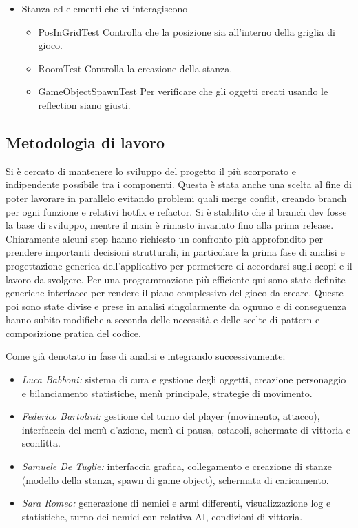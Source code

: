 \documentclass[a4paper,titlepage,12pt]{article}
\begin{document}
\begin{itemize}
    \newline
    \item Stanza ed elementi che vi interagiscono
        \begin{itemize}
            \item[\ding{51}] {PosInGridTest}
            \newline Controlla che la posizione sia all'interno della griglia di gioco.
            \item[\ding{51}] {RoomTest}
            \newline Controlla la creazione della stanza.
            \item[\ding{51}] GameObjectSpawnTest
            \newline Per verificare che gli oggetti creati usando le reflection siano giusti.
        \end{itemize}
\end{itemize}

\subsection{Metodologia di lavoro}
Si è cercato di mantenere lo sviluppo del progetto il più scorporato e indipendente possibile tra i componenti. Questa è stata anche una scelta al fine di poter lavorare in parallelo evitando problemi quali merge conflit, creando branch per ogni funzione e relativi hotfix e refactor. Si è stabilito che il branch dev fosse la base di sviluppo, mentre il main è rimasto invariato fino alla prima release. Chiaramente alcuni step hanno richiesto un confronto più approfondito per prendere importanti decisioni strutturali, in particolare la prima fase di analisi e progettazione generica dell'applicativo per permettere di accordarsi sugli scopi e il lavoro da svolgere. Per una programmazione più efficiente qui sono state definite generiche interfacce per rendere il piano complessivo del gioco da creare. Queste poi sono state divise e prese in analisi singolarmente da ognuno e di conseguenza hanno subito modifiche a seconda delle necessità e delle scelte di pattern e composizione pratica del codice.
\par \noindent Come già denotato in fase di analisi e integrando successivamente:
\begin{itemize}
    \item[\ding{228}] {\slshape Luca Babboni:} sistema di cura e gestione degli oggetti, creazione personaggio e bilanciamento statistiche, menù principale, strategie di movimento.
    \item[\ding{228}] {\slshape Federico Bartolini:} gestione del turno del player (movimento, attacco), interfaccia del menù d'azione, menù di pausa, ostacoli, schermate di vittoria e sconfitta.
    \item[\ding{228}] {\slshape Samuele De Tuglie:} interfaccia grafica, collegamento e creazione di stanze (modello della stanza, spawn di game object), schermata di caricamento.
    \item[\ding{228}] {\slshape Sara Romeo:} generazione di nemici e armi differenti, visualizzazione log e statistiche, turno dei nemici con relativa AI, condizioni di vittoria.
\end{itemize}
\end{document}
